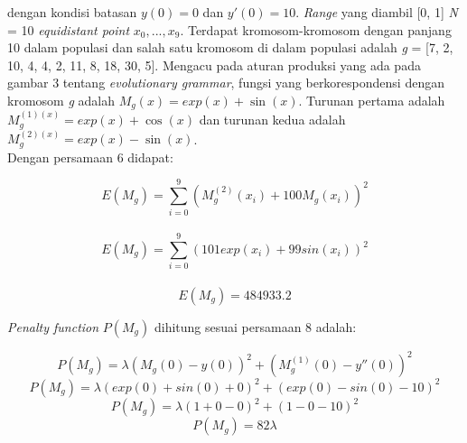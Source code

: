 \begin{enumerate}[1.]
dengan kondisi batasan \begin{math}y(0) = 0 \end{math} dan \begin{math}y'(0) = 10 \end{math}. \textit{Range} yang diambil [0, 1] \textit{N} = 10 \textit{equidistant point} \begin{math} x_0, ..., x_9 \end{math}. Terdapat kromosom-kromosom dengan panjang 10 dalam populasi dan salah satu kromosom di dalam populasi adalah \textit{g} = [7, 2, 10, 4, 4, 2, 11, 8, 18, 30, 5]. Mengacu pada aturan produksi yang ada pada gambar 3 tentang \textit{evolutionary grammar}, fungsi yang berkorespondensi dengan kromosom \textit{g} adalah \begin{math} M_g(x) = exp(x) + \sin (x) \end{math}. Turunan pertama adalah \begin{math} M_g^{(1)(x)} = exp(x) + \cos (x) \end{math} dan turunan kedua adalah \begin{math} M_g^{(2)(x)} = exp(x) - \sin (x) \end{math}. 
\\
Dengan persamaan 6 didapat:

	\begin{displaymath} E(M_g) = \sum_{i=0}^{9}(M_g^{(2)}(x_i)+100M_g(x_i))^{2} \end{displaymath}
\\
	\begin{displaymath} E(M_g) = \sum_{i=0}^{9}(101exp(x_i)+99sin(x_i))^{2}\end{displaymath}
\\
	\begin{displaymath} E(M_g) = 484933.2 \end{displaymath}

\textit{Penalty function} \begin{math}P(M_g) \end{math} dihitung sesuai persamaan 8 adalah:
	
	\begin{displaymath} P(M_g) = \lambda(M_g(0)-y(0))^{2}+(M_g^{(1)}(0)-y''(0))^{2} \end{displaymath}
	\begin{displaymath} P(M_g) = \lambda(exp(0)+sin(0)+0)^{2}+(exp(0)-sin(0)-10)^{2} \end{displaymath}
	\begin{displaymath} P(M_g) = \lambda(1+0-0)^{2}+(1-0-10)^{2} \end{displaymath}
	\begin{displaymath} P(M_g) = 82\lambda \end{displaymath}


\end{enumerate}
